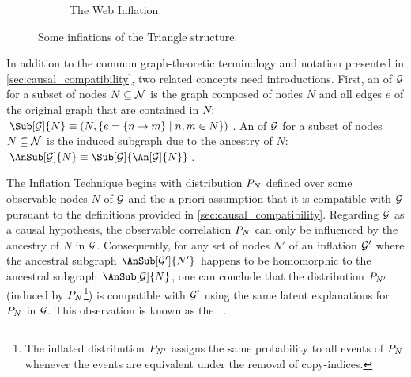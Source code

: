 \documentclass[aps, 10pt, english, twoside, pra, nofootinbib, tightenlines, longbibliography, superscriptaddress]{revtex4-1}
\begin{document}
\begin{nscenter}
\begin{figure}
    \begin{subfigure}[b]{.30\linewidth}
    \caption{The Web Inflation.}\label{fig:the_web_inflation}
    \end{subfigure}
    \caption{Some inflations of the Triangle structure.}
    \label{fig:inflations}
    \end{figure}
    \end{nscenter}

    In addition to the common graph-theoretic terminology and notation presented in \cref{sec:causal_compatibility}, two related concepts need introductions. First, an  of $\mathcal{G}$ for a subset of nodes $N \subseteq \mathcal{N}$ is the graph composed of nodes $N$ and all edges $e$ of the original graph that are contained in $N$: $\Sub[\graph]{N} \defined \br{N, \bc{e = \bc{n \to m} \mid n, m \in N}}$. An  of $\mathcal{G}$ for a subset of nodes $N \subseteq \mathcal{N}$ is the induced subgraph due to the ancestry of $N$: $\AnSub[\graph]{N} \defined \Sub[\graph]{\An[\graph]{N}}$.

    The Inflation Technique begins with distribution $\prob[N]$ defined over some observable nodes $N$ of $\mathcal{G}$ and the a priori assumption that it is compatible with $\mathcal{G}$ pursuant to the definitions provided in \cref{sec:causal_compatibility}. Regarding $\mathcal{G}$ as a causal hypothesis, the observable correlation $\prob[N]$ can only be influenced by the ancestry of $N$ in $\mathcal{G}$. Consequently, for any set of nodes $N'$ of an inflation $\mathcal{G}'$ where the ancestral subgraph $\AnSub[\graph']{N'}$ happens to be homomorphic to the ancestral subgraph $\AnSub[\graph]{N}$, one can conclude that the distribution $\prob[N']$ (induced by $\prob[N]$\footnote{The inflated distribution $\prob[N']$ assigns the same probability to all events of $\prob[N]$ whenever the events are equivalent under the removal of copy-indices.}) is compatible with $\mathcal{G}'$ using the same latent explanations for $\prob[N]$ in $\mathcal{G}$. This observation is known as the ~\cite[Lemma 3]{Inflation}.
\end{document}
